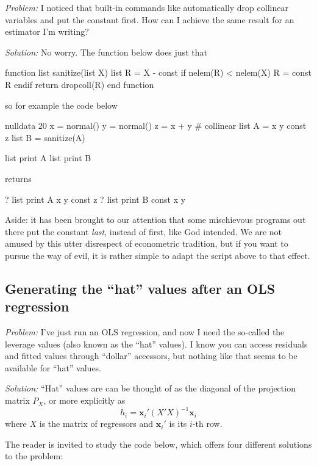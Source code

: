 \emph{Problem:} I noticed that built-in commands like 
automatically drop collinear variables and put the constant first. How
can I achieve the same result for an estimator I'm writing?

\emph{Solution:}
No worry. The function below does just that
\begin{code}
function list sanitize(list X)
    list R = X - const
    if nelem(R) < nelem(X)
        R = const R
    endif
    return dropcoll(R)
end function
\end{code}
so for example the code below
\begin{code}
nulldata 20
x = normal()
y = normal()
z = x + y # collinear
list A = x y const z
list B = sanitize(A)

list print A
list print B
\end{code}
returns
\begin{code}
? list print A
x y const z
? list print B
const x y
\end{code}

Aside: it has been brought to our attention that some mischievous
programs out there put the constant \emph{last}, instead of first,
like God intended. We are not amused by this utter disrespect of
econometric tradition, but if you want to pursue the way of evil, it
is rather simple to adapt the script above to that effect.


\subsection{Generating the ``hat'' values after an OLS regression}
\label{sec:hatvalues}

\emph{Problem:} I've just run an OLS regression, and now I need the
so-called the leverage values (also known as the ``hat'' values). I
know you can access residuals and fitted values through ``dollar''
accessors, but nothing like that seems to be available for ``hat''
values.

\emph{Solution:}
``Hat'' values are can be thought of as the diagonal of the projection
matrix $P_X$, or more explicitly as
\[
h_i = \mathbf{x}_i' (X'X)^{-1} \mathbf{x}_i
\]
where $X$ is the matrix of regressors and $\mathbf{x}_i'$ is its
$i$-th row.

The reader is invited to study the code below, which offers four
different solutions to the problem:


